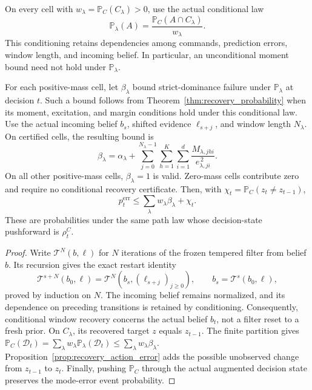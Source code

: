 On every cell with $w_\lambda=\mathbb P_C(C_\lambda)>0$, use the actual conditional law
\begin{equation}
 \mathbb P_\lambda(A)=
 \frac{\mathbb P_C(A\cap C_\lambda)}{w_\lambda}.
 \label{eq:actual_window_conditional_law}
\end{equation}
This conditioning retains dependencies among commands, prediction errors, window length, and incoming belief.
In particular, an unconditional moment bound need not hold under $\mathbb P_\lambda$.

\begin{theorem}
\label{thm:random_window_recovery}
For each positive-mass cell, let $\beta_\lambda$ bound strict-dominance failure under $\mathbb P_\lambda$ at decision $t$.
Such a bound follows from Theorem~\ref{thm:recovery_probability} when its moment, excitation, and margin conditions hold under this conditional law.
Use the actual incoming belief $b_s$, shifted evidence $\ell_{s+j}$, and window length $N_\lambda$.
On certified cells, the resulting bound is
\begin{equation}
 \beta_\lambda=\alpha_\lambda+
 \sum_{j=0}^{N_\lambda-1}\sum_{h=1}^{K}\sum_{i=1}^{d}
 \frac{M_{\lambda,jhi}}{e_{\lambda,ji}^{\,2}}.
 \label{eq:conditional_window_budget}
\end{equation}
On all other positive-mass cells, $\beta_\lambda=1$ is valid.
Zero-mass cells contribute zero and require no conditional recovery certificate.
Then, with $\chi_t=\mathbb P_C(z_t\ne z_{t-1})$,
\begin{equation}
 p_t^{\mathrm{err}}\le
 \sum_{\lambda}w_\lambda\beta_\lambda+\chi_t.
 \label{eq:random_window_mode_error}
\end{equation}
These are probabilities under the same path law whose decision-state pushforward is $\rho_t^C$.
\end{theorem}

\begin{proof}
Write $\mathcal T^N(b,\ell)$ for $N$ iterations of the frozen tempered filter from belief $b$.
Its recursion gives the exact restart identity
\begin{equation}
 \mathcal T^{s+N}(b_0,\ell)=
 \mathcal T^N\!\left(b_s,(\ell_{s+j})_{j\ge0}\right),
 \qquad b_s=\mathcal T^s(b_0,\ell),
 \label{eq:filter_window_restart}
\end{equation}
proved by induction on $N$.
The incoming belief remains normalized, and its dependence on preceding transitions is retained by conditioning.
Consequently, conditional window recovery concerns the actual belief $b_t$, not a filter reset to a fresh prior.
On $C_\lambda$, its recovered target $z$ equals $z_{t-1}$.
The finite partition gives
$\mathbb P_C(\mathcal D_t)=\sum_\lambda w_\lambda\mathbb P_\lambda(\mathcal D_t)
\le\sum_\lambda w_\lambda\beta_\lambda$.
Proposition~\ref{prop:recovery_action_error} adds the possible unobserved change from $z_{t-1}$ to $z_t$.
Finally, pushing $\mathbb P_C$ through the actual augmented decision state preserves the mode-error event probability.
\end{proof}

